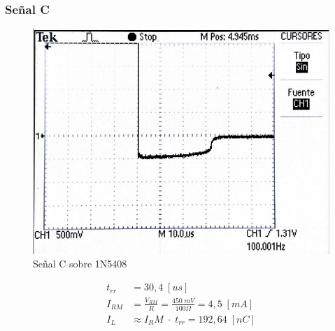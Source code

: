 \documentclass{article}
\begin{document}
\subsubsection{Señal C}
\begin{figure}[h]
 \begin{center}
	\includegraphics[scale=0.5]{imagenes/1N5408_C.jpg} 
	\caption{Señal C sobre 1N5408}
 \end{center}
\end{figure}
%
\begin{align*}
	t_{rr} &= 30,4 \; [us] \\
	I_{RM}	&= \frac{V_{RM}}{R} = \frac{450 \; mV}{100 \Omega} = 4,5 \; [mA] \\
	I_L	&\approx {I_RM} \; \cdot \; t_{rr} = 192,64 \; [nC]
\end{align*}
%
\end{document}
